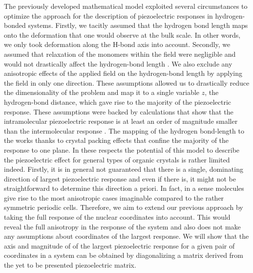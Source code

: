 The previously developed mathematical model exploited several circumstances to optimize the approach for the description
of piezoelectric responses in hydrogen-bonded systems. 
Firstly, we tacitly assumed that the hydrogen bond length maps onto the
deformation that one would observe at the bulk scale. 
In other words, we only took deformation along the H-bond axis into account.  
Secondly, we assumed that relaxation of the monomers within the field were negligible and would not
drastically affect the hydrogen-bond length \cite{Werling1}.  
We also exclude any anisotropic effects of the applied field on the hydrogen-bond length by
applying the field in only one direction.  
These assumptions allowed us to drastically reduce the dimensionality of the problem and map it to a single
variable $z$, the hydrogen-bond distance, which gave rise to the majority of
the piezoelectric response. 
These assumptions were backed by calculations that
show that the intramolecular piezoelectric response is at least an order of
magnitude smaller than the intermolecular response \cite{Werling1}.  
The mapping of the hydrogen bond-length to the \dtt{} works thanks to crystal packing effects that
confine the majority of the response to one plane. 
In these respects the potential of this model to describe the piezoelectric
effect for general types of organic crystals is rather limited indeed. 
Firstly, it is in general not guaranteed that there is a single, dominating direction of
largest piezoelectric response and even if there is, it might not be
straightforward to determine this direction a priori. 
In fact, in a sense molecules give rise to the most anisotropic cases imaginable compared to the
rather symmetric periodic cells.  
Therefore, we aim to extend our previous
approach by taking the full response of the nuclear coordinates into account.
This would reveal the full anisotropy in the response of the system and also does not make any assumptions about coordinates of the largest response.
We will show that the axis and magnitude of of the largest piezoelectric response for a given pair of coordinates in a system can be obtained 
by diagonalizing a matrix derived from the yet to be presented piezoelectric matrix.  
